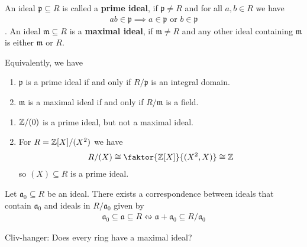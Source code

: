 \begin{dfn}[]
An ideal $\mathfrak{p} \subseteq R$ is called a \textbf{prime ideal}, if $\mathfrak{p} \neq R$ and for all $a,b \in R$ we have
\begin{align*}
  ab \in \mathfrak{p} \implies a \in \mathfrak{p} \text{ or } b \in \mathfrak{p}
\end{align*}.
An ideal $\mathfrak{m} \subseteq R$ is a \textbf{maximal ideal}, if $\mathfrak{m} \neq R$ and any other ideal containing $\mathfrak{m}$ is either $\mathfrak{m}$ or $R$.

Equivalently, we have
\begin{enumerate}
  \item $\mathfrak{p}$ is a prime ideal if and only if $R/\mathfrak{p}$ is an integral domain.
  \item $\mathfrak{m}$ is a maximal ideal if and only if $R/\mathfrak{m}$ is a field.
\end{enumerate}
\end{dfn}

\begin{enumerate}
  \item $\mathbb{Z}/(0)$ is a prime ideal, but not a maximal ideal.
  \item For $R = \mathbb{Z}[X]/(X^{2})$ we have
    \begin{align*}
      R/(X) \iso \faktor{\Z[X]}{(X^{2},X)} \iso \Z
    \end{align*}
    so $(X) \subseteq R$ is a prime ideal.
\end{enumerate}


\begin{prop}[]
  Let $\mathfrak{a}_0 \subseteq R$ be an ideal.
  There exists a correspondence between ideals that contain $\mathfrak{a}_0$ and ideals in $R/\mathfrak{a}_0$ given by
  \begin{align*}
    \mathfrak{a}_0 \subseteq \mathfrak{a} \subseteq R \leftrightsquigarrow \mathfrak{a} + \mathfrak{a}_0 \subseteq R/\mathfrak{a}_0
  \end{align*}
\end{prop}

Cliv-hanger: Does every ring have a maximal ideal?
